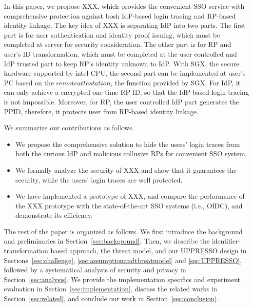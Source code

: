 In this paper, we propose XXX, which provides the convenient SSO service with comprehensive protection against bosh IdP-based login tracing and RP-based identity linkage. The key idea of XXX is separating IdP into two parts. The first part is for user authentication and identity proof issuing, which must be completed at server for security consideration. The other part is for RP and user's ID transformation, which must be completed at the user controlled and IdP trusted part to keep RP's identity unknown to IdP. With SGX, the secure hardware supported by intel CPU, the second part can be implemented at user's PC based on the $remote attestation$, the function provided by SGX. For IdP, it can only achieve a encrypted one-time RP ID, so that the IdP-based login tracing is not impossible. Moreover, for RP, the user controlled IdP part generates the PPID, therefore, it protects user from RP-based identity linkage.

We summarize our contributions as follows.
\begin{itemize}
\item We propose the comprehensive solution to hide the users' login traces from both the curious IdP and malicious collusive RPs for convenient SSO system.
\item We formally analyze the security of XXX and show that it guarantees the security, while the users' login traces are well protected.
\item We have implemented a prototype of XXX, and compare the performance of the XXX prototype with the state-of-the-art SSO systems (i.e., OIDC), and demonstrate its efficiency.
\end{itemize}

The rest of the paper is organized as follows. We first introduce the background and preliminaries in Section~\ref{sec:background}. Then, we describe the identifier-transformation based approach, the threat model, and our UPPRESSO design in Sections~\ref{sec:challenge}, \ref{sec:assumptionandthreatmodel} and \ref{sec:UPPRESSO}, followed by a systematical analysis of security and privacy in Section~\ref{sec:analysis}. We provide the implementation specifics and experiment evaluation in Section~\ref{sec:implementation}, discuss the related works in Section~\ref{sec:related}, and conclude our work in Section~\ref{sec:conclusion}.
